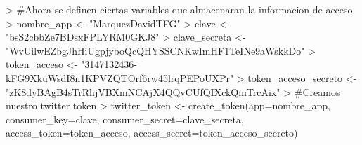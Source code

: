
\begin{Schunk}
\begin{Sinput}
>   #Ahora se definen ciertas variables que almacenaran la informacion de acceso
>   nombre_app <- "MarquezDavidTFG"
>   clave <- "bsS2cbbZe7BDsxFPLYRM0GKJ8"
>   clave_secreta <- "WvUilwEZbgJhHiUgpjyboQcQHYSSCNKwImHF1TeINe9aWskkDo"
>   token_acceso <- "3147132436-kFG9XkuWsdI8n1KPVZQTOrf6rw45lrqPEPoUXPr"
>   token_acceso_secreto <- "zK8dyBAgB4sTrRhjVBXmNCAjX4QQvCUfQIXckQmTrcAix"
>   #Creamos nuestro twitter token
>   twitter_token <- create_token(app=nombre_app, consumer_key=clave, consumer_secret=clave_secreta, access_token=token_acceso, access_secret=token_acceso_secreto)
\end{Sinput}
\end{Schunk}




